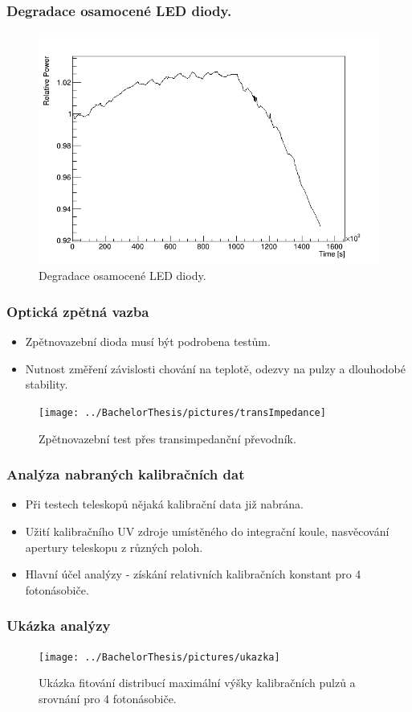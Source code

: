\documentclass{beamer}
\begin{document}
\begin{frame}
\frametitle{Degradace osamocené LED diody.}
 \begin{figure}[H]
 \centering
 \includegraphics[scale=0.4, angle = 0, origin = c]{corrected1}
 \caption{Degradace osamocené LED diody.}
 \label{UVsource}
\end{figure}


\end{frame}



\begin{frame}
\frametitle{Optická zpětná vazba}


\begin{itemize}
 \item Zpětnovazební dioda musí být podrobena testům.
 \item Nutnost změření závislosti chování na teplotě, odezvy na pulzy a dlouhodobé stability.


\end{itemize}


 \begin{figure}[H]
 \centering
 \texttt{[image: ../BachelorThesis/pictures/transImpedance]}
 \caption{Zpětnovazební test přes transimpedanční převodník.}
 \label{UVsource}
\end{figure}


\end{frame}


\begin{frame}
\frametitle{Analýza nabraných kalibračních dat}
\begin{itemize}
 \item Při testech teleskopů nějaká kalibrační data již nabrána.
 \item Užití kalibračního UV zdroje umístěného do integrační koule, nasvěcování apertury teleskopu z různých poloh. 
 \item Hlavní účel analýzy - získání relativních kalibračních konstant pro 4 fotonásobiče.


\end{itemize}





\end{frame}

\begin{frame}
\frametitle{Ukázka analýzy}
 \begin{figure}[H]
 \centering
 \texttt{[image: ../BachelorThesis/pictures/ukazka]}
 \caption{Ukázka fitování distribucí maximální výšky kalibračních pulzů a srovnání pro 4 fotonásobiče.}
 \label{UVsource}
\end{figure}


\end{frame}
\end{document}
